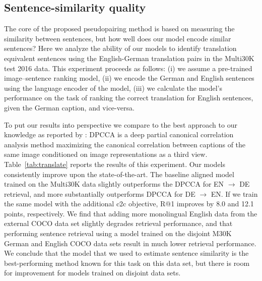 \subsection{Sentence-similarity quality}

The core of the proposed pseudopairing method is based on measuring the similarity between sentences, but how well does our model encode similar sentences? Here we analyze the ability of our models to identify translation equivalent sentences using the English-German translation pairs in the Multi30K test 2016 data. This experiment proceeds as follows: (i) we assume a pre-trained image--sentence ranking model, (ii) we encode the German and English sentences using the language encoder of the model, (iii) we calculate the model's performance on the task of ranking the correct translation for English sentences, given the German caption, and vice-versa. 

To put our results into perspective we compare to the 
best approach
to our knowledge as reported by \cite{rotman2018bridging}: DPCCA is a deep partial canonical correlation analysis method maximizing the canonical correlation between captions of the same image conditioned on image representations as a third view. 
Table~\ref{tab:translate} reports the results of this experiment.
Our models consistently improve upon the state-of-the-art. The baseline aligned model trained on the Multi30K data slightly outperforms the DPCCA for EN $\rightarrow$ DE retrieval, and more substantially outperforms DPCCA for DE $\rightarrow$ EN. If we train the same model with the additional c2c objective, R@1 improves by 8.0 and 12.1 points, respectively. We find that adding more monolingual English data from the external COCO data set slightly degrades retrieval performance, and that performing sentence retrieval using a model trained on the disjoint M30K German and English COCO data sets result in much lower retrieval performance. We conclude that the model that we used to estimate sentence similarity is the best-performing method known for this task on this data set, but there is room for improvement for models trained on disjoint data sets.



